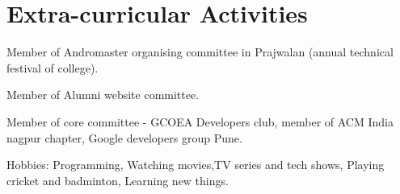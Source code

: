 \documentclass[]{deedy-resume-openfont}
\begin{document}
\begin{minipage}[t]{0.66\textwidth}

\section{Extra-curricular Activities} 
\vspace{3mm}
\begin{tightemize}
 \item Member of Andromaster organising committee in Prajwalan (annual technical festival of college).
 \item Member of Alumni website committee.
 \item Member of core committee - GCOEA Developers club, member of ACM India nagpur chapter, Google developers group Pune.
 \item Hobbies: Programming, Watching movies,TV series and tech shows, Playing cricket and badminton,
Learning new things.
\end{tightemize}

\sectionsep

\end{minipage} 
\end{document}
